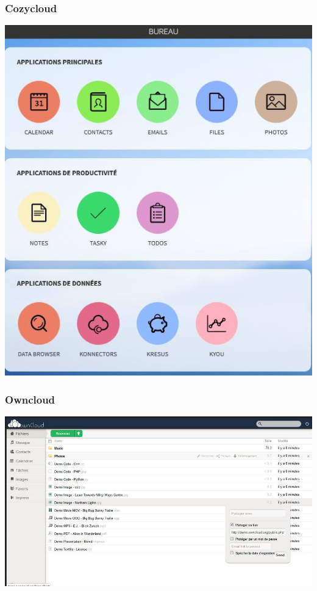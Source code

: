 \documentclass{beamer}
\begin{document}
\begin{frame}
\begin{center}
\frametitle{Cozycloud}
\includegraphics[scale=0.6] {./images/Cozycloud.jpg}
\end{center}
\end{frame}

\begin{frame}
\begin{center}
\frametitle{Owncloud}
\includegraphics[scale=0.6] {./images/owncloud.jpg}
\end{center}
\end{frame}
\end{document}
